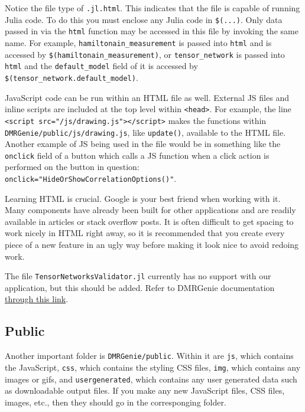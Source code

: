 \documentclass{article}
\begin{document}
\begin{multicols}{2}
Notice the file type of \lstinline|.jl.html|. This indicates that the file is capable of running Julia code. To do this you must enclose any Julia code in \lstinline|$(...)|. Only data passed in via the \lstinline|html| function may be accessed in this file by invoking the same name. For example, \lstinline|hamiltonain_measurement| is passed into \lstinline|html| and is accessed by \lstinline|$(hamiltonain_measurement)|, or \lstinline|tensor_network| is passed into \lstinline|html| and the \lstinline|default_model| field of it is accessed by \lstinline|$(tensor_network.default_model)|.

JavaScript code can be run within an HTML file as well. External JS files and inline scripts are included at the top level within \lstinline|<head>|. For example, the line \lstinline|<script src="/js/drawing.js"></script>| makes the functions within \lstinline|DMRGenie/public/js/drawing.js|, like \lstinline|update()|, available to the HTML file. Another example of JS being used in the file would be in something like the \lstinline|onclick| field of a button which calls a JS function when a click action is performed on the button in question: \lstinline|onclick="HideOrShowCorrelationOptions()"|.

Learning HTML is crucial. Google is your best friend when working with it. Many components have already been built for other applications and are readily available in articles or stack overflow posts. It is often difficult to get spacing to work nicely in HTML right away, so it is recommended that you create every piece of a new feature in an ugly way before making it look nice to avoid redoing work.

The file \lstinline|TensorNetworksValidator.jl| currently has no support with our application, but this should be added. Refer to DMRGenie documentation \href{https://genieframework.github.io/Genie.jl/dev/}{through this link}.


\subsection{Public}

Another important folder is \lstinline|DMRGenie/public|. Within it are \lstinline|js|, which contains the JavaScript,  \lstinline|css|, which contains the styling CSS files, \lstinline|img|, which contains any images or gifs, and \lstinline|usergenerated|,  which contains any user generated data such as downloadable output files. If you make any new JavaScript files, CSS files, images, etc., then they should go in the corresponging folder.


\end{multicols}
\end{document}
